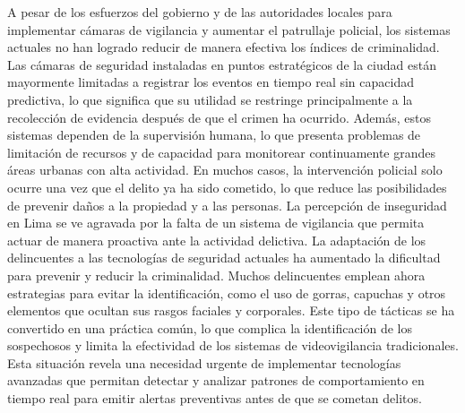 A pesar de los esfuerzos del gobierno y de las autoridades locales para implementar cámaras de vigilancia y aumentar el patrullaje policial, los sistemas actuales no han logrado reducir de manera efectiva los índices de criminalidad. Las cámaras de seguridad instaladas en puntos estratégicos de la ciudad están mayormente limitadas a registrar los eventos en tiempo real sin capacidad predictiva, lo que significa que su utilidad se restringe principalmente a la recolección de evidencia después de que el crimen ha ocurrido. Además, estos sistemas dependen de la supervisión humana, lo que presenta problemas de limitación de recursos y de capacidad para monitorear continuamente grandes áreas urbanas con alta actividad. En muchos casos, la intervención policial solo ocurre una vez que el delito ya ha sido cometido, lo que reduce las posibilidades de prevenir daños a la propiedad y a las personas.
La percepción de inseguridad en Lima se ve agravada por la falta de un sistema de vigilancia que permita actuar de manera proactiva ante la actividad delictiva. La adaptación de los delincuentes a las tecnologías de seguridad actuales ha aumentado la dificultad para prevenir y reducir la criminalidad. Muchos delincuentes emplean ahora estrategias para evitar la identificación, como el uso de gorras, capuchas y otros elementos que ocultan sus rasgos faciales y corporales. Este tipo de tácticas se ha convertido en una práctica común, lo que complica la identificación de los sospechosos y limita la efectividad de los sistemas de videovigilancia tradicionales. Esta situación revela una necesidad urgente de implementar tecnologías avanzadas que permitan detectar y analizar patrones de comportamiento en tiempo real para emitir alertas preventivas antes de que se cometan delitos.

